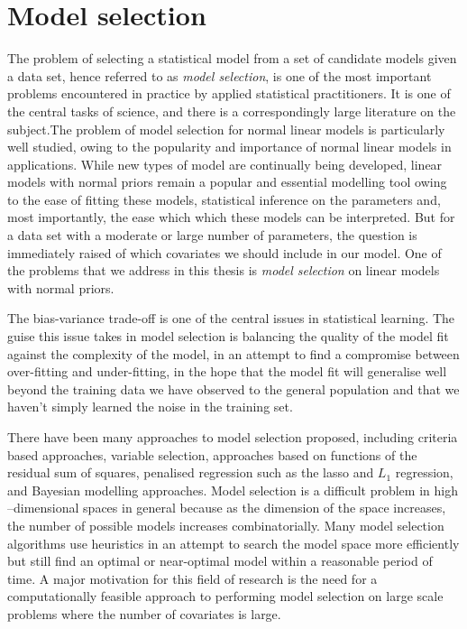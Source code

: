 \section{Model selection}
The problem of selecting a statistical model from a set of candidate models given a data set, hence referred
to as \emph{model selection}, is one of the most important problems encountered in practice by applied
statistical practitioners. It is one of the central tasks of science, and there is a correspondingly large
literature on the subject.The problem of model selection for normal linear models is particularly well
studied, owing to the popularity and importance of normal linear models in applications. While new types of
model are continually being developed, linear models with normal priors remain a popular and essential
modelling tool owing to the ease of fitting these models, statistical inference on the parameters and, most
importantly, the ease which which these models can be interpreted. But for a data set with a moderate or large
number of parameters, the question is immediately raised of which covariates we should include in our model.
One of the problems that we address in this thesis is \emph{model selection} on linear models with normal
priors.

The bias-variance trade-off is one of the central issues in statistical learning. The guise this issue takes
in model selection is balancing the quality of the model fit against the complexity of the model, in an
attempt to find a compromise between over-fitting and under-fitting, in the hope that the model fit will
generalise well beyond the training data we have observed to the general population and that we haven't simply
learned the noise in the training set.

There have been many approaches to model selection proposed, including criteria based approaches, variable
selection, approaches based on functions of the residual sum of squares, penalised regression such as the
lasso and $L_1$ regression, and Bayesian modelling approaches. Model selection is a difficult problem in high
--dimensional spaces in general because as the dimension of the space increases, the number of possible models
increases combinatorially. Many model selection algorithms use heuristics in an attempt to search the model
space more efficiently but still find an optimal or near-optimal model within a reasonable period of time. A
major motivation for this field of research is the need for a computationally feasible approach to performing
model selection on large scale problems where the number of covariates is large.

